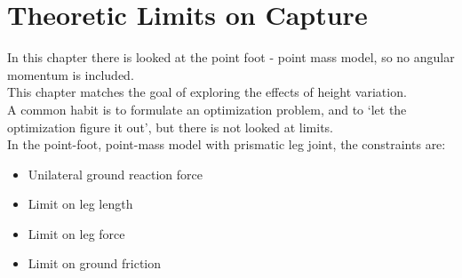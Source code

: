 %
\chapter{Theoretic Limits on Capture}
In this chapter there is looked at the point foot - point mass model, so no angular momentum is included.\\
This chapter matches the goal of exploring the effects of height variation.\\
A common habit is to formulate an optimization problem, and to `let the optimization figure it out', but there is not looked at limits.\\
In the point-foot, point-mass model with prismatic leg joint, the constraints are:
\begin{itemize}
	\item Unilateral ground reaction force
	\item Limit on leg length
	\item Limit on leg force
	\item Limit on ground friction
\end{itemize}

